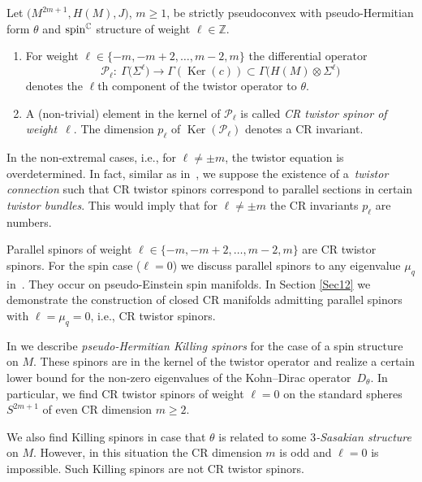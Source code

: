 \documentclass[pdftex]{sigma}
\numberwithin{equation}{section}
\newcommand{\ZZ}{\mathbb{Z}}
\newcommand{\CC}{\mathbb{C}}
\begin{document}
\begin{Definition} Let $\big(M^{2m+1},H(M),J\big)$, $m\geq 1$, be strictly pseudoconvex
with pseudo-Her\-mi\-tian form $\theta$ and ${\rm spin}^\CC$ structure of weight $\ell\in\ZZ$.
\begin{enumerate}\itemsep=0pt
\item[(a)] For weight $\ell\in\{-m,-m+2,\dots,m-2,m\}$
the differential operator
\[
\mathcal{P}_\ell\colon \ \Gamma\big(\Sigma^{\ell}\big) \to \Gamma(\operatorname{Ker}(c)) \subset \Gamma\big(H(M)\otimes \Sigma^{\ell}\big)
\]
denotes the $\ell$th component of the twistor operator to $\theta$.

\item[(b)] A (non-trivial) element in the kernel of $\mathcal{P}_\ell$ is called \emph{CR twistor spinor of weight~$\ell$}.
The dimension $p_\ell$ of $\operatorname{Ker}(\mathcal{P}_\ell)$ denotes a CR invariant.
\end{enumerate}
\end{Definition}

In the non-extremal cases, i.e., for $\ell\neq \pm m$, the twistor equation is overdetermined.
In fact, similar as in~\cite{Pil}, we suppose the existence of a~{\em twistor connection} such that CR twistor spinors correspond to parallel sections in certain {\em twistor bundles}. This would
imply that for $\ell\neq \pm m$ the CR invariants $p_\ell$ are numbers.

\begin{Example} Parallel spinors of weight $\ell\in\{-m,-m+2,\dots,m-2,m\}$ are CR twistor spinors. For the spin case ($\ell=0$)
we discuss parallel spinors to any eigenvalue $\mu_q$ in~\cite{LeiN2}. They occur on pseudo-Einstein spin manifolds. In Section \ref{Sec12} we
demonstrate the construction of closed CR manifolds admitting parallel spinors with $\ell=\mu_q=0$, i.e., CR twistor spinors.
\end{Example}

\begin{Example}
In \cite{LeiN1} we describe {\em pseudo-Hermitian Killing spinors} for the case of a spin structure on $M$.
These spinors are in the kernel of the twistor operator and realize a certain lower bound for the non-zero eigenvalues of the Kohn--Dirac operator~$D_\theta$.
In particular, we find CR twistor spinors of weight $\ell=0$ on the standard spheres $S^{2m+1}$ of even CR dimension $m\geq 2$.

We also find Killing spinors in case that $\theta$
is related to some {\em $3$-Sasakian structure} on $M$. However, in this situation the CR dimension $m$ is odd and
$\ell=0$ is impossible. Such Killing spinors are not CR twistor spinors.
\end{Example}
\end{document}
